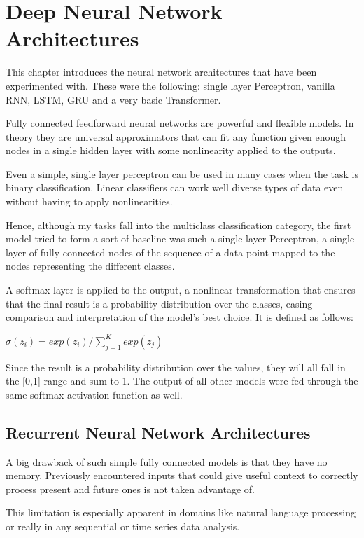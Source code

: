 \documentclass[bsc,frontabs,singlespacing,parskip,deptreport]{infthesis}
\begin{document}
\chapter{Deep Neural Network Architectures}

This chapter introduces the neural network architectures that have been experimented with. These were the following: single layer Perceptron, vanilla RNN, LSTM, GRU and a very basic Transformer.

Fully connected feedforward neural networks are powerful and flexible models. In theory they are universal approximators that can fit any function given enough nodes in a single hidden layer with some nonlinearity applied to the outputs.

Even a simple, single layer perceptron can be used in many cases when the task is binary classification. Linear classifiers can work well diverse types of data even without having to apply nonlinearities.

Hence, although my tasks fall into the multiclass classification category, the first model tried to form a sort of baseline was such a single layer Perceptron, a single layer of fully connected nodes of the sequence of a data point mapped to the nodes representing the different classes.

A softmax layer is applied to the output, a nonlinear transformation that ensures that the final result is a probability distribution over the classes, easing comparison and interpretation of the model's best choice. It is defined as follows:

\begin{center}
$ \sigma (z_i) = exp(z_i) / \sum_{j=1}^K exp(z_j) $
\end{center}

Since the result is a probability distribution over the values, they will all fall in the [0,1] range and sum to 1. The output of all other models were fed through the same softmax activation function as well.

\section{Recurrent Neural Network Architectures}

A big drawback of such simple fully connected models is that they have no memory. Previously encountered inputs that could give useful context to correctly process present and future ones is not taken advantage of. 

This limitation is especially apparent in domains like natural language processing or really in any sequential or time series data analysis.
\end{document}
